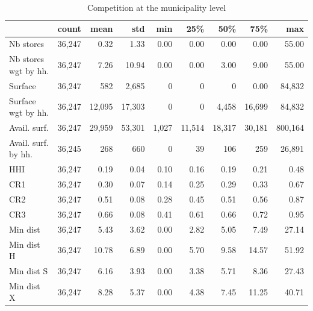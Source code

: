 \documentclass[11pt]{article}
\begin{document}
\begin{table}[H]
\caption{Competition at the municipality level}
\small
\begin{tabular}{lrrrrrrrr}
\toprule
\toprule
{} &      count &       mean &        std &        min &        25\% &        50\% &        75\% &        max \\
\midrule
Nb stores                       &  36,247 &       0.32 &       1.33 &       0.00 &       0.00 &       0.00 &       0.00 &      55.00 \\
Nb stores wgt by hh.    &  36,247 &       7.26 &       10.94 &       0.00 &       0.00 &       3.00 &       9.00 &      55.00 \\
Surface                         &  36,247 &     582 &   2,685 &       0 &       0 &       0 &       0.00 &  84,832 \\
Surface wgt by hh.      &  36,247 &     12,095 &   17,303 &       0 &       0 &       4,458 &       16,699 &  84,832 \\
Avail. surf.                    &  36,247 &  29,959 &  53,301 &   1,027 &  11,514 &  18,317 &  30,181 & 800,164 \\
Avail. surf. by hh.        &  36,245 &        268 &        660 &           0 &             39 &       106 &          259 &  26,891 \\
HHI                               &  36,247 &       0.19 &       0.04 &       0.10 &       0.16 &       0.19 &       0.21 &       0.48 \\
CR1                              &  36,247 &       0.30 &       0.07 &       0.14 &       0.25 &       0.29 &       0.33 &       0.67 \\
CR2                              &  36,247 &       0.51 &       0.08 &       0.28 &       0.45 &       0.51 &       0.56 &       0.87 \\
CR3                              &  36,247 &       0.66 &       0.08 &       0.41 &       0.61 &       0.66 &       0.72 &       0.95 \\
Min dist                        &  36,247 &       5.43 &       3.62 &       0.00 &       2.82 &       5.05 &       7.49 &      27.14 \\
Min dist H                    &  36,247 &      10.78 &       6.89 &       0.00 &       5.70 &       9.58 &      14.57 &      51.92 \\
Min dist S                     &  36,247 &       6.16 &       3.93 &       0.00 &       3.38 &       5.71 &       8.36 &      27.43 \\
Min dist X                   &  36,247 &       8.28 &       5.37 &       0.00 &       4.38 &       7.45 &      11.25 &      40.71 \\
\bottomrule
\end{tabular}

\end{table}
\end{document}
